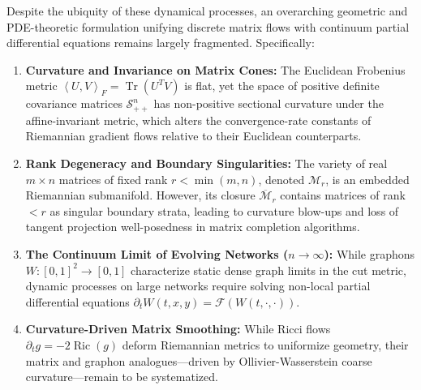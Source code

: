 \documentclass[11pt,a4paper,reqno]{amsart}
\theoremstyle{definition}
\numberwithin{equation}{section}
\newcommand{\Tr}{\operatorname{Tr}}
\newcommand{\Ric}{\operatorname{Ric}}
\newcommand{\inner}[2]{\left\langle #1, #2 \right\rangle}
\begin{document}
Despite the ubiquity of these dynamical processes, an overarching geometric and PDE-theoretic formulation unifying discrete matrix flows with continuum partial differential equations remains largely fragmented. Specifically:
\begin{enumerate}[label=(\alph*)]
    \item \textbf{Curvature and Invariance on Matrix Cones:} The Euclidean Frobenius metric $\inner{U}{V}_F = \Tr(U^T V)$ is flat, yet the space of positive definite covariance matrices $\mathcal{S}_{++}^n$ has non-positive sectional curvature under the affine-invariant metric, which alters the convergence-rate constants of Riemannian gradient flows relative to their Euclidean counterparts.
    \item \textbf{Rank Degeneracy and Boundary Singularities:} The variety of real $m \times n$ matrices of fixed rank $r < \min(m, n)$, denoted $\mathcal{M}_r$, is an embedded Riemannian submanifold. However, its closure $\overline{\mathcal{M}}_r$ contains matrices of rank $< r$ as singular boundary strata, leading to curvature blow-ups and loss of tangent projection well-posedness in matrix completion algorithms.
    \item \textbf{The Continuum Limit of Evolving Networks ($n \to \infty$):} While graphons $W \colon [0, 1]^2 \to [0, 1]$ characterize static dense graph limits in the cut metric, dynamic processes on large networks require solving non-local partial differential equations $\partial_t W(t, x, y) = \mathcal{F}(W(t, \cdot, \cdot))$.
    \item \textbf{Curvature-Driven Matrix Smoothing:} While Ricci flows $\partial_t g = -2 \Ric(g)$ deform Riemannian metrics to uniformize geometry, their matrix and graphon analogues---driven by Ollivier-Wasserstein coarse curvature---remain to be systematized.
\end{enumerate}
\end{document}
